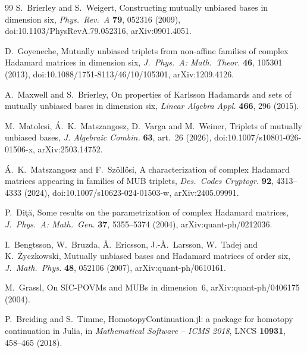 \documentclass[11pt]{article}
\numberwithin{equation}{section}
\theoremstyle{plain}
\theoremstyle{definition}
\theoremstyle{remark}
\begin{document}
\begin{thebibliography}{99}
S.~Brierley and S.~Weigert, Constructing mutually unbiased bases in dimension six, \emph{Phys.\ Rev.\ A} \textbf{79}, 052316 (2009), doi:10.1103/PhysRevA.79.052316, arXiv:0901.4051.

D.~Goyeneche, Mutually unbiased triplets from non-affine families of complex Hadamard matrices in dimension six, \emph{J.\ Phys.\ A: Math.\ Theor.} \textbf{46}, 105301 (2013), doi:10.1088/1751-8113/46/10/105301, arXiv:1209.4126.

A.~Maxwell and S.~Brierley, On properties of Karlsson Hadamards and sets of mutually unbiased bases in dimension six, \emph{Linear Algebra Appl.} \textbf{466}, 296 (2015).

M.~Matolcsi, \'A.~K.~Matszangosz, D.~Varga and M.~Weiner, Triplets of mutually unbiased bases, \emph{J. Algebraic Combin.} \textbf{63}, art.~26 (2026), doi:10.1007/s10801-026-01506-x, arXiv:2503.14752.

\'A.~K.~Matszangosz and F.~Sz\"oll\H{o}si, A characterization of complex Hadamard matrices appearing in families of MUB triplets, \emph{Des.\ Codes Cryptogr.} \textbf{92}, 4313--4333 (2024), doi:10.1007/s10623-024-01503-w, arXiv:2405.09991.

P.~Di\c{t}\u{a}, Some results on the parametrization of complex Hadamard matrices, \emph{J.\ Phys.\ A: Math.\ Gen.} \textbf{37}, 5355--5374 (2004), arXiv:quant-ph/0212036.

I.~Bengtsson, W.~Bruzda, \AA.~Ericsson, J.-\AA.~Larsson, W.~Tadej and K.~\.Zyczkowski, Mutually unbiased bases and Hadamard matrices of order six, \emph{J.\ Math.\ Phys.} \textbf{48}, 052106 (2007), arXiv:quant-ph/0610161.

M.~Grassl, On SIC-POVMs and MUBs in dimension~6, arXiv:quant-ph/0406175 (2004).

P.~Breiding and S.~Timme, HomotopyContinuation.jl: a package for homotopy continuation in Julia, in \emph{Mathematical Software -- ICMS 2018}, LNCS \textbf{10931}, 458--465 (2018).

\end{thebibliography}
\end{document}
